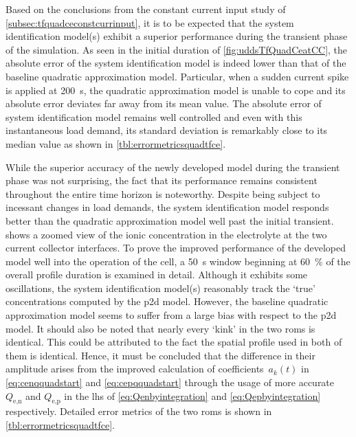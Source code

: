Based   on   the   conclusions   from   the   constant   current   input   study
of \cref{subsec:tfquadceconstcurrinput},  it   is  to   be  expected   that  the
system  identification  model(s)  exhibit  a  superior  performance  during  the
transient  phase   of  the   simulation.  As  seen   in  the   initial  duration
of \cref{fig:uddsTfQuadCeatCC}, the absolute error  of the system identification
model is indeed  lower than that of the baseline  quadratic approximation model.
Particular, when a sudden current spike is applied at \approx \SI{200}{\second},
the  quadratic approximation  model is  unable to  cope and  its absolute  error
deviates  far  away   from  its  mean  value.  The  absolute   error  of  system
identification model  remains well controlled  and even with  this instantaneous
load demand, its standard deviation is remarkably close to its median value as
shown in \cref{tbl:errormetricsquadtfce}.



While the  superior accuracy of the  newly developed model during  the transient
phase  was not  surprising, the  fact  that its  performance remains  consistent
throughout  the  entire  time  horizon  is  noteworthy.  Despite  being  subject
to  incessant  changes   in  load  demands,  the   system  identification  model
responds better  than the  quadratic approximation model  well past  the initial
transient.   shows  a  zoomed  view of  the
ionic concentration in the electrolyte  at the two current collector interfaces.
To prove the improved performance of the developed model well into the operation
of the cell, a \SI{50}{\second} window beginning at \approx \SI{60}{\percent} of
the overall  profile duration is examined  in detail. Although it  exhibits some
oscillations,  the system  identification model(s)  reasonably track  the `true'
concentrations computed by the \gls{p2d}  model. However, the baseline quadratic
approximation  model seems  to suffer  from  a large  bias with  respect to  the
\gls{p2d} model.  It should also  be noted that nearly  every `kink' in  the two
\glspl{rom}  is identical.  This could  be attributed  to the  fact the  spatial
profile  used  in  both of  them  is  identical.  Hence,  it must  be  concluded
that  the difference  in their  amplitude arises  from the  improved calculation
of coefficients~$a_k(t)$ in \cref{eq:cenqquadstart} and \cref{eq:cepqquadstart}
through  the  usage  of  more  accurate  $Q_{\text{e,n}}$  and  $Q_{\text{e,p}}$
in  the  \gls{lhs} of \cref{eq:Qenbyintegration}  and \cref{eq:Qepbyintegration}
respectively.  Detailed   error  metrics  of   the  two  \glspl{rom}   is  shown
in \cref{tbl:errormetricsquadtfce}.

